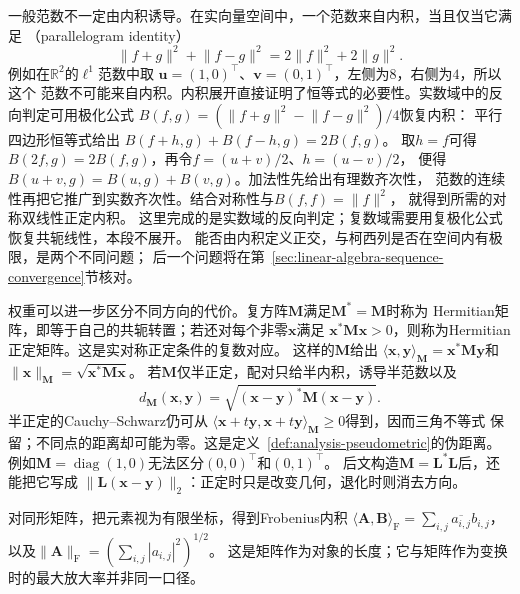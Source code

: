 一般范数不一定由内积诱导。在实向量空间中，一个范数来自内积，当且仅当它满足
（parallelogram identity）
\begin{equation}
  \lVert f+g\rVert^2+\lVert f-g\rVert^2
  =
  2\lVert f\rVert^2+2\lVert g\rVert^2.
  \label{eq:functional-parallelogram-identity}
\end{equation}
例如在$\mathbb{R}^2$的$\ell^1$范数中取
$\bm{u}=(1,0)^{\top}$、$\bm{v}=(0,1)^{\top}$，左侧为$8$，右侧为$4$，所以这个
范数不可能来自内积。内积展开直接证明了恒等式的必要性。实数域中的反向判定可用极化公式
$B(f,g)=(\lVert f+g\rVert^2-\lVert f-g\rVert^2)/4$恢复内积：
平行四边形恒等式给出
$B(f+h,g)+B(f-h,g)=2B(f,g)$。
取$h=f$可得$B(2f,g)=2B(f,g)$，再令$f=(u+v)/2$、$h=(u-v)/2$，
便得$B(u+v,g)=B(u,g)+B(v,g)$。加法性先给出有理数齐次性，
范数的连续性再把它推广到实数齐次性。结合对称性与$B(f,f)=\lVert f\rVert^2$，
就得到所需的对称双线性正定内积。
这里完成的是实数域的反向判定；复数域需要用复极化公式恢复共轭线性，本段不展开。
能否由内积定义正交，与柯西列是否在空间内有极限，是两个不同问题；
后一个问题将在第~\ref{sec:linear-algebra-sequence-convergence}节核对。


权重可以进一步区分不同方向的代价。复方阵$\bm M$满足$\bm M^*=\bm M$时称为
Hermitian矩阵，即等于自己的共轭转置；若还对每个非零$\bm x$满足
$\bm x^*\bm M\bm x>0$，则称为Hermitian正定矩阵。这是实对称正定条件的复数对应。
这样的$\bm M$给出
$\langle\bm x,\bm y\rangle_{\bm M}=\bm x^*\bm M\bm y$和
$\lVert\bm x\rVert_{\bm M}=\sqrt{\bm x^*\bm M\bm x}$。
若$\bm M$仅半正定，配对只给半内积，诱导半范数以及
\begin{equation}
 d_{\bm M}(\bm x,\bm y)
 =\sqrt{(\bm x-\bm y)^*\bm M(\bm x-\bm y)}.
 \label{eq:linear-algebra-mahalanobis-pseudodistance}
\end{equation}
半正定的Cauchy--Schwarz仍可从
$\langle\bm x+t\bm y,\bm x+t\bm y\rangle_{\bm M}\geq0$得到，因而三角不等式
保留；不同点的距离却可能为零。这是定义~\ref{def:analysis-pseudometric}的伪距离。
例如$\bm M=\operatorname{diag}(1,0)$无法区分$(0,0)^\top$和$(0,1)^\top$。
后文构造$\bm M=\bm L^*\bm L$后，还能把它写成
$\lVert\bm L(\bm x-\bm y)\rVert_2$：正定时只是改变几何，退化时则消去方向。

对同形矩阵，把元素视为有限坐标，得到Frobenius内积
$\langle\bm A,\bm B\rangle_{\mathrm F}=\sum_{i,j}\overline{a_{i,j}}b_{i,j}$，
以及$\lVert\bm A\rVert_{\mathrm F}=(\sum_{i,j}|a_{i,j}|^2)^{1/2}$。
这是矩阵作为对象的长度；它与矩阵作为变换时的最大放大率并非同一口径。


